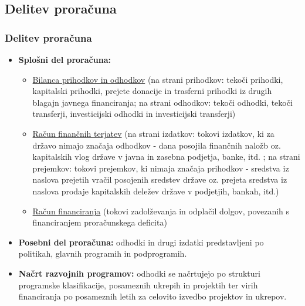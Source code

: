 \documentclass[10pt]{beamer}
\begin{document}
\begin{frame}
\subsection[Deitev propračuna]{Delitev proračuna}
\frametitle{Delitev proračuna}
	\begin{itemize}
	\item \textbf{Splošni del proračuna:}
		\begin{itemize}
		\item \underline{Bilanca prihodkov in odhodkov} (na strani prihodkov: tekoči prihodki, kapitalski prihodki, prejete donacije in trasferni prihodki iz drugih blagajn javnega financiranja; na strani odhodkov: tekoči odhodki, tekoči transferji, investicijski odhodki in investicijski transferji)
		\item \underline{Račun finančnih terjatev} (na strani izdatkov: tokovi izdatkov, ki za državo nimajo značaja odhodkov - dana posojila finančnih naložb oz. kapitalskih vlog države v javna in zasebna podjetja, banke, itd. ; na strani prejemkov: tokovi prejemkov, ki nimaja značaja prihodkov - sredstva iz naslova prejetih vračil posojenih sredstev države oz. prejeta sredstva iz naslova prodaje kapitalskih deležev države v podjetjih, bankah, itd.)
		\item \underline{Račun financiranja} (tokovi zadolževanja in odplačil dolgov, povezanih s financiranjem proračunskega deficita)
		\end{itemize}
	\item \textbf{Posebni del proračuna:} odhodki in drugi izdatki predstavljeni po politikah, glavnih programih in podprogramih.
	\item \textbf{Načrt razvojnih programov:} odhodki se načrtujejo po strukturi programske klasifikacije, posameznih ukrepih in projektih ter virih financiranja po  posameznih letih za celovito izvedbo projektov in ukrepov.
	\end{itemize}
\end{frame}
\end{document}

